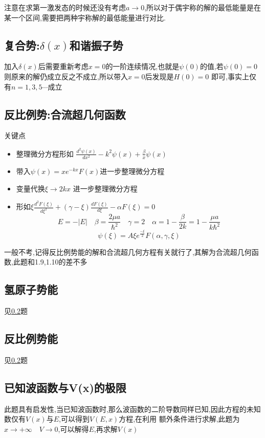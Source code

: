         注意在求第一激发态的时候还没有考虑$a \to 0$,所以对于偶宇称的解的最低能量是在某一个区间,需要把两种宇称解的最低能量进行对比.

    \subsection{复合势:\texorpdfstring{$\delta(x)$}{}和谐振子势}
        加入$\delta(x)$后需要重新考虑$x=0$的一阶连续情况,也就是$\psi(0)$的值,若$\psi(0)=0$则原来的解仍成立反之不成立,所以带入$x=0$后发现是$H(0)=0$
        即可,事实上仅有$n=1,3,5\cdots$成立

    \subsection{反比例势:合流超几何函数}\label{subsec:1.8}
        关键点
        \begin{itemize}
            \item 整理微分方程形如 \quad $\frac{d^{2}\psi(x)}{d x^{2}}-k^{2}\psi(x)+\frac{\beta}{x}\psi(x)$
            \item 带入$\psi(x)=x e^{-kx}F(x)$进一步整理微分方程
            \item 变量代换$\xi \to 2kx$ 进一步整理微分方程
            \item 形如\quad $\xi \frac{d^{2}F(\xi)}{d \xi^{2}}+(\gamma-\xi)\frac{dF(\xi)}{d \xi}-\alpha F(\xi)=0$  
                  $$ E=-|E| \quad \beta=\frac{2\mu a}{\hbar^{2}} \quad \gamma=2 \quad \alpha=1-\frac{\beta}{2k}=1-\frac{\mu a}{k \hbar^{2}}$$ 
                  $$ \psi(\xi)=A\xi e^{\frac{-\xi}{2}} F(\alpha,\gamma,\xi)   $$
        \end{itemize}
        一般不考,记得反比例势能的解和合流超几何方程有关就行了,其解为合流超几何函数,此题和1.9,1.10的差不多
    
    \subsection{氢原子势能}
        见\ref{subsec:1.8}题

    \subsection{反比例势能}
        见\ref{subsec:1.8}题

    \subsection{已知波函数与\texorpdfstring{V(x)}{}的极限}\label{subsec:1.11}
        此题具有启发性,当已知波函数时,那么波函数的二阶导数同样已知,因此\sdr 方程的未知数仅有$V(x)$与$E$,可以得到$V(E,x)$方程,在利用
        额外条件进行求解,此题为$x \to +\infty \quad V \to 0$,可以解得$E$,再求解$V(x)$ 

